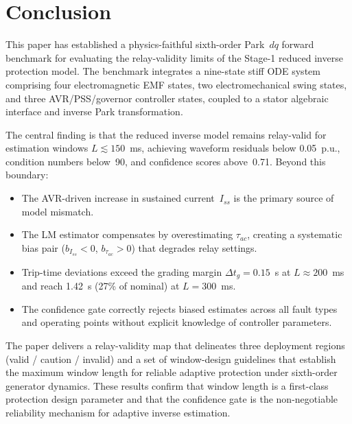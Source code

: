 \documentclass[journal,twoside,letterpaper]{IEEEtran}
\begin{document}
\section{Conclusion}
\label{sec:conclusion}

This paper has established a physics-faithful
sixth-order Park~$dq$ forward benchmark for evaluating the
relay-validity limits of the Stage-1 reduced inverse
protection model.
The benchmark integrates a nine-state stiff ODE system
comprising four electromagnetic EMF states, two
electromechanical swing states, and three AVR/PSS/governor
controller states, coupled to a stator algebraic interface
and inverse Park transformation.

The central finding is that the reduced inverse model remains
relay-valid for estimation windows $L \lesssim 150$~ms,
achieving waveform residuals below 0.05~p.u., condition
numbers below~90, and confidence scores above~0.71.
Beyond this boundary:
\begin{itemize}
  \item The AVR-driven increase in sustained current~$I_{ss}$
    is the primary source of model mismatch.
  \item The LM estimator compensates by overestimating
    $\tau_{ac}$, creating a systematic bias pair
    ($b_{I_{ss}} < 0$, $b_{\tau_{ac}} > 0$) that degrades
    relay settings.
  \item Trip-time deviations exceed the grading margin
    $\Delta t_g = 0.15$~s at $L \approx 200$~ms and reach
    1.42~s (27\% of nominal) at $L = 300$~ms.
  \item The confidence gate correctly rejects biased
    estimates across all fault types and operating points
    without explicit knowledge of controller parameters.
\end{itemize}

The paper delivers a relay-validity map that delineates
three deployment regions (valid / caution / invalid) and
a set of window-design guidelines that establish the maximum
window length for reliable adaptive protection under
sixth-order generator dynamics.
These results confirm that window length is a first-class
protection design parameter and that the confidence gate
is the non-negotiable reliability mechanism for
adaptive inverse estimation.



\end{document}
